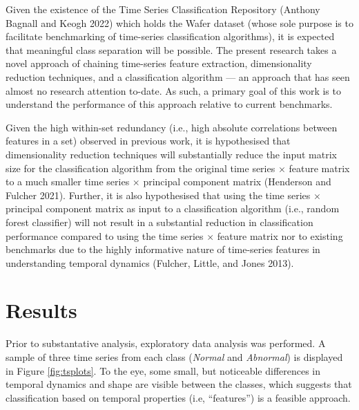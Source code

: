 \documentclass{article}
\begin{document}
Given the existence of the Time Series Classification Repository (Anthony Bagnall and Keogh 2022) which holds the Wafer dataset (whose sole purpose is to facilitate benchmarking of time-series classification algorithms), it is expected that meaningful class separation will be possible. The present research takes a novel approach of chaining time-series feature extraction, dimensionality reduction techniques, and a classification algorithm --- an approach that has seen almost no research attention to-date. As such, a primary goal of this work is to understand the performance of this approach relative to current benchmarks.

Given the high within-set redundancy (i.e., high absolute correlations between features in a set) observed in previous work, it is hypothesised that dimensionality reduction techniques will substantially reduce the input matrix size for the classification algorithm from the original time series \(\times\) feature matrix to a much smaller time series \(\times\) principal component matrix (Henderson and Fulcher 2021). Further, it is also hypothesised that using the time series \(\times\) principal component matrix as input to a classification algorithm (i.e., random forest classifier) will not result in a substantial reduction in classification performance compared to using the time series \(\times\) feature matrix nor to existing benchmarks due to the highly informative nature of time-series features in understanding temporal dynamics (Fulcher, Little, and Jones 2013).

\hypertarget{results}{%
\section{Results}\label{results}}

Prior to substantative analysis, exploratory data analysis was performed. A sample of three time series from each class (\emph{Normal} and \emph{Abnormal}) is displayed in Figure \ref{fig:tsplots}. To the eye, some small, but noticeable differences in temporal dynamics and shape are visible between the classes, which suggests that classification based on temporal properties (i.e, ``features'') is a feasible approach.
\end{document}
